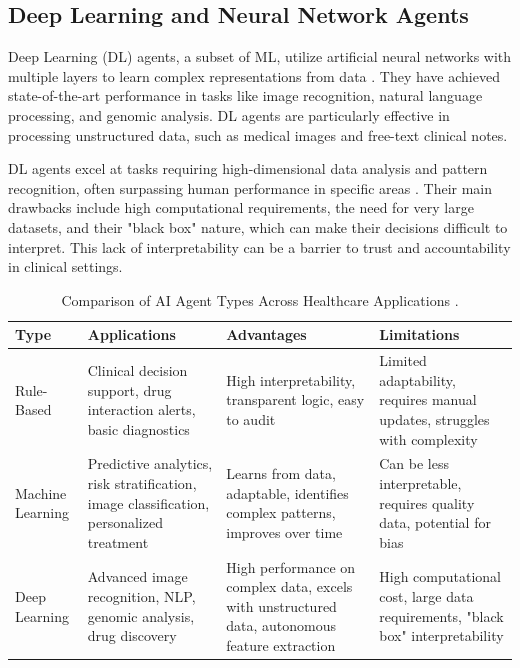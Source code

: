 \documentclass[12pt,a4paper]{article}
\begin{document}
\subsection{Deep Learning and Neural Network Agents}
Deep Learning (DL) agents, a subset of ML, utilize artificial neural networks with multiple layers to learn complex representations from data \cite{lecun2015deep}. They have achieved state-of-the-art performance in tasks like image recognition, natural language processing, and genomic analysis. DL agents are particularly effective in processing unstructured data, such as medical images and free-text clinical notes.

DL agents excel at tasks requiring high-dimensional data analysis and pattern recognition, often surpassing human performance in specific areas \cite{esteva2017dermatologist}. Their main drawbacks include high computational requirements, the need for very large datasets, and their "black box" nature, which can make their decisions difficult to interpret. This lack of interpretability can be a barrier to trust and accountability in clinical settings.

\begin{table}[H]
  \centering
  \caption{Comparison of AI Agent Types Across Healthcare Applications \cite{russell2010artificial, lecun2015deep}.}
  \label{tab:ai_agent_comparison}
  \begin{tabularx}{\textwidth}{>{\raggedright\arraybackslash}p{2.5cm}
                                >{\raggedright\arraybackslash}X
                                >{\raggedright\arraybackslash}X
                                >{\raggedright\arraybackslash}X}
    \toprule
    \textbf{Type} & \textbf{Applications} & \textbf{Advantages} & \textbf{Limitations} \\
    \midrule
    Rule-Based & Clinical decision support, drug interaction alerts, basic diagnostics & High interpretability, transparent logic, easy to audit & Limited adaptability, requires manual updates, struggles with complexity \\
    \addlinespace
    Machine Learning & Predictive analytics, risk stratification, image classification, personalized treatment & Learns from data, adaptable, identifies complex patterns, improves over time & Can be less interpretable, requires quality data, potential for bias \\
    \addlinespace
    Deep Learning & Advanced image recognition, NLP, genomic analysis, drug discovery & High performance on complex data, excels with unstructured data, autonomous feature extraction & High computational cost, large data requirements, "black box" interpretability \\
    \bottomrule
  \end{tabularx}
\end{table}
\end{document}
